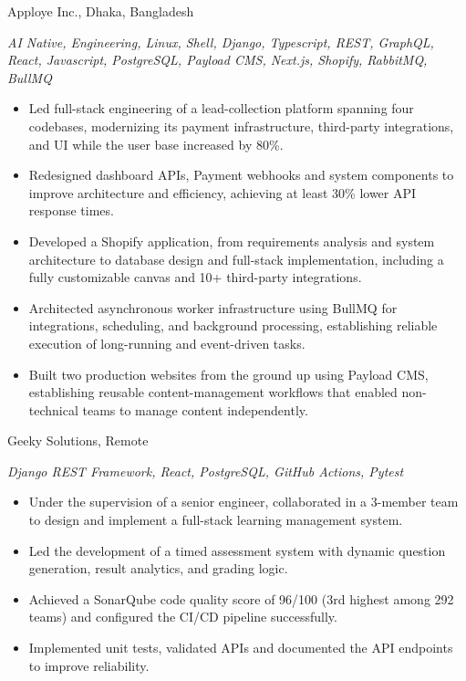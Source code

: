 Apploye Inc., Dhaka, Bangladesh\par
\textit{AI Native, Engineering, Linux, Shell, Django, Typescript, REST, GraphQL, React, Javascript, PostgreSQL, Payload CMS, Next.js, Shopify, RabbitMQ, BullMQ }\par
\begin{itemize}
  \item Led full-stack engineering of a lead-collection platform spanning four codebases, modernizing its payment infrastructure, third-party integrations, and UI while the user base increased by 80\%.
  \item Redesigned dashboard APIs, Payment webhooks and system components to improve architecture and efficiency, achieving at least 30\% lower API response times.
  \item Developed a Shopify application, from requirements analysis and system architecture to database design and full-stack implementation, including a fully customizable canvas and 10+ third-party integrations.
  \item Architected asynchronous worker infrastructure using BullMQ for integrations, scheduling, and background processing, establishing reliable execution of long-running and event-driven tasks.
  \item Built two production websites from the ground up using Payload CMS, establishing reusable content-management workflows that enabled non-technical teams to manage content independently. \newline
\end{itemize}
Geeky Solutions, Remote\par
\textit{Django REST Framework, React, PostgreSQL, GitHub Actions, Pytest}\par
\begin{itemize}
  \item Under the supervision of a senior engineer, collaborated in a 3-member team to design and implement a full-stack learning management system.
  \item Led the development of a timed assessment system with dynamic question generation, result analytics, and grading logic.
  \item Achieved a SonarQube code quality score of 96/100 (3rd highest among 292 teams) and configured the CI/CD pipeline successfully.
  \item Implemented unit tests, validated APIs and documented the API endpoints to improve reliability.
\end{itemize}
